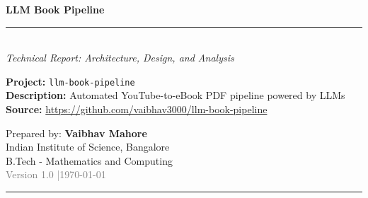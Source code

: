 \documentclass[11pt,a4paper]{article}
\begin{document}

\begin{titlepage}
\pagecolor{DarkBG}
\color{white}
\centering
\vspace*{3cm}

{\fontsize{36}{44}\selectfont\bfseries LLM Book Pipeline}\\[0.5cm]
{\color{AccentRed}\rule{\textwidth}{3pt}}\\[0.8cm]
{\Large\itshape Technical Report: Architecture, Design, and Analysis}\\[2cm]

\begin{tcolorbox}[colback=white!10!DarkBG, colframe=AccentRed, width=0.85\textwidth,
    arc=6pt, boxrule=1pt]
\centering
\large
\textbf{Project:} \texttt{llm-book-pipeline}\\[0.4em]
\textbf{Description:} Automated YouTube-to-eBook PDF pipeline powered by LLMs\\[0.4em]
\textbf{Source:} \url{https://github.com/vaibhav3000/llm-book-pipeline}
\end{tcolorbox}

\vspace{2cm}
{\large Prepared by: \textbf{Vaibhav Mahore}}\\[0.4em]
{\large Indian Institute of Science, Bangalore}\\[0.4em]
{\large B.Tech - Mathematics and Computing}\\[1.5cm]

{\normalsize\textcolor{gray}{Version 1.0 \quad|\quad \today}}
\vfill
{\color{AccentRed}\rule{\textwidth}{3pt}}
\end{titlepage}
\pagecolor{white}
\color{black}

\newpage
\begin{abstract}
\noindent
This report presents a comprehensive technical analysis of \textbf{llm-book-pipeline}, an automated four-stage pipeline that converts a YouTube playlist of educational lectures into an eBook-quality PDF manuscript using Large Language Model (LLM) APIs. The pipeline ingests a YouTube playlist (specifically the ``Building LLMs from Scratch'' series), fetches and cleans raw transcripts via \texttt{youtube-transcript-api} and \texttt{yt-dlp}, chunks the transcript text using a sliding-window strategy with configurable overlap, expands each chunk into polished book-quality prose using an LLM (DeepSeek/Groq/Anthropic), assembles a complete manuscript with AI-generated foreword and glossary, and renders a publication-quality PDF via ReportLab--all without any LaTeX dependency. The system is designed for idempotency, full resumability, and cost efficiency through file-based caching of all LLM outputs. A free-API variant using the Groq API (Llama 3.3-70B) is also provided. This report covers the problem statement, end-to-end architecture, module-level code analysis, algorithmic design decisions, LLM integration strategy, prompt engineering methodology, known limitations, and potential improvements.
\end{abstract}
\end{document}
